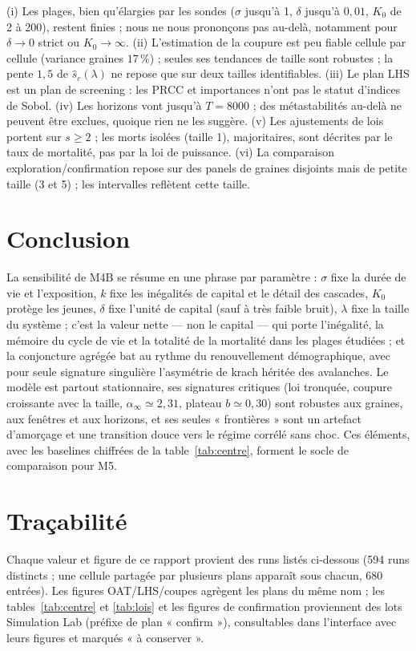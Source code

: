 \documentclass[11pt,a4paper]{article}
\begin{document}
(i) Les plages, bien qu'élargies par les sondes ($\sigma$ jusqu'à 1,
$\delta$ jusqu'à $0{,}01$, $K_0$ de 2 à 200), restent finies ; nous ne
nous prononçons pas au-delà, notamment pour $\delta\to0$ strict ou
$K_0\to\infty$. (ii) L'estimation de la coupure est peu fiable cellule
par cellule (variance graines $17\,\%$) ; seules ses tendances de
taille sont robustes ; la pente $1{,}5$ de $\hat s_c(\lambda)$ ne
repose que sur deux tailles identifiables. (iii) Le plan LHS est un
plan de screening : les PRCC et importances n'ont pas le statut
d'indices de Sobol. (iv) Les horizons vont jusqu'à $T=8000$ ; des
métastabilités au-delà ne peuvent être exclues, quoique rien ne les
suggère. (v) Les ajustements de lois portent sur $s\ge2$ ; les morts
isolées (taille 1), majoritaires, sont décrites par le taux de
mortalité, pas par la loi de puissance. (vi) La comparaison
exploration/confirmation repose sur des panels de graines disjoints
mais de petite taille (3 et 5) ; les intervalles reflètent cette
taille.

\section{Conclusion}

La sensibilité de M4B se résume en une phrase par paramètre : $\sigma$
fixe la durée de vie et l'exposition, $k$ fixe les inégalités de
capital et le détail des cascades, $K_0$ protège les jeunes, $\delta$
fixe l'unité de capital (sauf à très faible bruit), $\lambda$ fixe la
taille du système ; c'est la valeur nette — non le capital — qui
porte l'inégalité, la mémoire du cycle de vie et la totalité de la
mortalité dans les plages étudiées ; et la conjoncture agrégée bat au
rythme du renouvellement démographique, avec pour seule signature
singulière l'asymétrie de krach héritée des avalanches. Le modèle est partout stationnaire, ses signatures critiques
(loi tronquée, coupure croissante avec la taille,
$\alpha_\infty\simeq2{,}31$, plateau $b\simeq0{,}30$) sont robustes aux
graines, aux fenêtres et aux horizons, et ses seules « frontières »
sont un artefact d'amorçage et une transition douce vers le régime
corrélé sans choc. Ces éléments, avec les baselines chiffrées de la
table~\ref{tab:centre}, forment le socle de comparaison pour M5.

\appendix

\section{Traçabilité}
\label{sec:annexe}

Chaque valeur et figure de ce rapport provient des runs listés
ci-dessous (594 runs distincts ; une cellule partagée par plusieurs
plans apparaît sous chacun, 680 entrées). Les figures OAT/LHS/coupes
agrègent les plans du même nom ; les tables~\ref{tab:centre} et
\ref{tab:lois} et les figures de confirmation proviennent des lots
Simulation Lab (préfixe de plan « confirm »), consultables dans
l'interface avec leurs figures et marqués « à conserver ».


\end{document}
